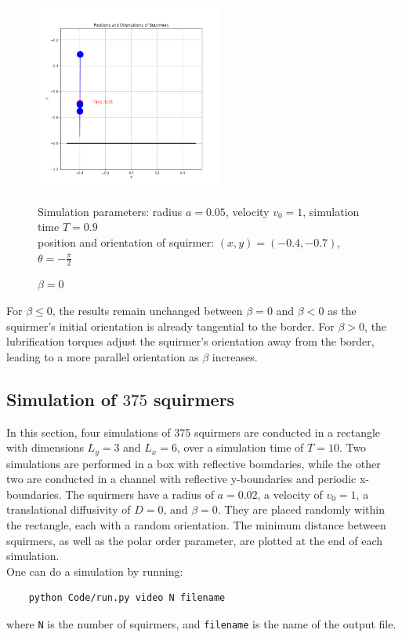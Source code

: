 \documentclass{article}
\begin{document}
\begin{figure}[H]
    \centering
    \includegraphics[width=0.55\textwidth]{graphs/simulations/border/beta0/mpi_2.png}
    \caption{\footnotesize $\beta = 0$}
    Simulation parameters: radius $a=0.05$, velocity $v_0=1$, simulation time $T=0.9$\\
        position and orientation of squirmer: $(x,y)=(-0.4,-0.7)$, $\theta=-\frac{\pi}{2}$
\end{figure}
For $\beta \le 0$, the results remain unchanged between $\beta = 0$ and $\beta < 0$ as the 
squirmer's initial orientation is already tangential to the border.
 For $\beta > 0$, the lubrification torques adjust the squirmer's orientation away from the border, 
 leading to a more parallel orientation as $\beta$ increases.

\subsection{Simulation of $375$ squirmers}
In this section, four simulations of 375 squirmers are conducted in a rectangle with dimensions $L_y = 3$ and $L_x=6$, over 
a simulation time of $T=10$. Two simulations are performed in a box with reflective boundaries, while the other two are conducted in
 a channel with reflective y-boundaries and periodic x-boundaries.
The squirmers have a radius of $a = 0.02$, a velocity of $v_0 = 1$, a translational diffusivity of $D=0$, and $\beta = 0$.
 They are placed randomly within the rectangle, each with a random orientation. The minimum distance between 
 squirmers, as well as the polar order parameter, are plotted at the end of each simulation.\\
One can do a simulation by running:
\begin{verbatim}
    python Code/run.py video N filename
\end{verbatim} 
where \texttt{N} is the number of squirmers, and \texttt{filename} is the name of the output file.
\end{document}
